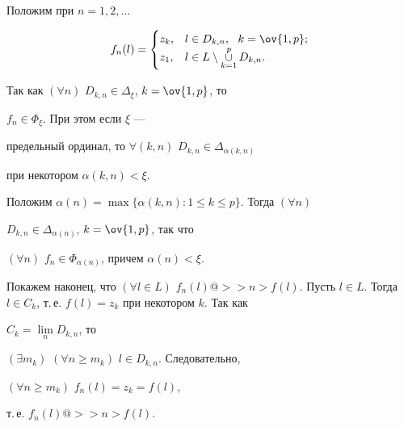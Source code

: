 \begin{pf}
Положим при $n=1,2,\dotsc$ 


$$ 


f_n(l)= 


\begin{cases} 


z_k, & l\in D_{k,n},\ \ k=\ov{1,p};\\ 


z_1, & l\in L\setminus\mycup^p_{k=1}D_{k,n}. 


\end{cases} 


$$ 


Так как $(\forall n)$ $D_{k,n}\in\Delta_\xi$, $k=\ov{1,p}$, то 


$f_n\in\Phi_\xi$. При этом если $\xi$ --- 


предельный ординал, то $\forall(k,n)$ $D_{k,n}\in \Delta_{\alpha(k,n)}$ 


при некотором $\alpha(k,n)<\xi$. 


Положим $\alpha(n)=\max\{\alpha(k,n):1\le k\le p\}$. Тогда $(\forall n)$ 


$D_{k,n}\in\Delta_{\alpha(n)}$, $k=\ov{1,p}$, так что 


$(\forall n)$ $f_n\in\Phi_{\alpha(n)}$, причем $\alpha(n)<\xi$. 


 


Покажем наконец, что $(\forall l\in L)$ $f_n(l)@>>n>f(l)$. Пусть $l\in 


L$. Тогда $l\in C_k$, т.\,е. $f(l)=z_k$ при некотором $k$. Так как 


$C_k=\lim\limits_n D_{k,n}$, то 


$(\exists m_k)$ $(\forall n\ge m_k)$ $l\in D_{k,n}$. Следовательно, 


$(\forall n\ge m_k)$ $f_n(l)=z_k=f(l)$, 


т.\,е. $f_n(l)@>>n>f(l)$. 


\end{pf} 


 


